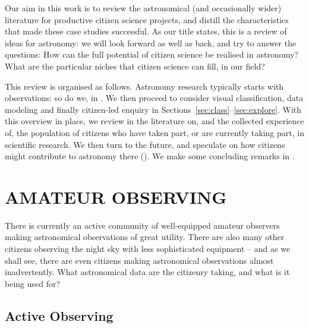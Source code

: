 \documentclass{ar2e}
\begin{document}
Our aim in this work is to review the astronomical (and occasionally wider)
literature for productive citizen science projects, and distill the
characteristics that made these case studies successful.  As our title states,
this is a review of ideas for astronomy: we will look forward as well as back,
and try to answer the questions: How can the full potential of citizen science
be realised in astronomy? What are the particular niches that citizen science
can fill, in our field? 


This review is organised as follows. Astronomy research typically starts with
observations: so do we, in . We then proceed to consider  visual
classification, data modeling and finally citizen-led enquiry in 
Sections~\ref{sec:class}--\ref{sec:explore}. With this overview in place, we
review in  the literature on, and the collected experience of,
the population of citizens who have taken part, or are currently taking part,
in scientific research. We then turn to the future, and speculate on how
citizens might contribute to astronomy there (). We
make some concluding remarks in .



\section{AMATEUR OBSERVING}
\label{sec:obs}

There is currently an active community of well-equipped amateur observers making
astronomical observations of great utility. There are also many other citizens
observing the night sky with less sophisticated equipment -- and as we shall
see, there are even citizens making  astronomical observations almost
inadvertently. What astronomical data are the citizenry taking, and what is it
being used for?



\subsection{Active Observing}
\label{sec:obs:active}
\end{document}
